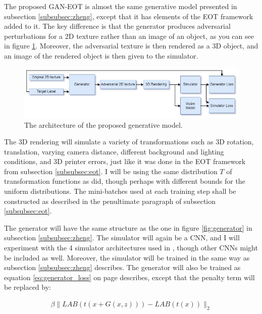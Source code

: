 The proposed GAN-EOT is almost the same generative model presented in subsection \ref{subsubsec:zheng}, except that it has elements of the EOT framework \cite{athalye} added to it. The key difference is that the generator produces adversarial perturbations for a 2D texture rather than an image of an object, as you can see in figure \ref{fig:proposed_model}. Moreover, the adversarial texture is then rendered as a 3D object, and an image of the rendered object is then given to the simulator.

\begin{figure}[h]
    \centering
    \includegraphics[width=1\textwidth]{graphics/model.jpg}
    \caption{The architecture of the proposed generative model.}
    \label{fig:proposed_model}
\end{figure}

The 3D rendering will simulate a variety of transformations such as 3D rotation, translation, varying camera distance, different background and lighting conditions, and 3D printer errors, just like it was done in the EOT framework from subsection \ref{subsubsec:eot}. I will be using the same distribution $T$ of transformation functions as \cite{athalye} did, though perhaps with different bounds for the uniform distributions. The mini-batches used at each training step shall be constructed as described in the penultimate paragraph of subsection \ref{subsubsec:eot}.

The generator will have the same structure as the one in figure \ref{fig:generator} in subsection \ref{subsubsec:zheng}. The simulator will again be a CNN, and I will experiment with the 4 simulator architectures used in \cite{zheng_black_box_GAN}, though other CNNs might be included as well. Moreover, the simulator will be trained in the same way as subsection \ref{subsubsec:zheng} describes. The generator will also be trained as equation \ref{eq:generator_loss} on page \pageref{eq:generator_loss} describes, except that the penalty term will be replaced by:

\begin{equation}
    \begin{aligned}
    \beta\|LAB(t(x + G(x,z))) - LAB(t(x))\|_2
    \end{aligned}
\end{equation}

